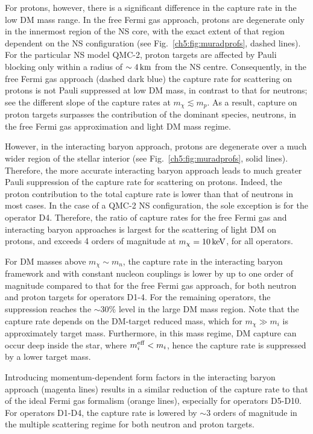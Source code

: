 For protons, however, there is a significant difference in the capture rate in the low DM mass range. In the free Fermi gas approach, protons are degenerate only in the innermost region of the NS core, with the exact extent of that region dependent on the NS configuration (see Fig.~\ref{ch5:fig:muradprofs}, dashed lines).  For the particular NS model QMC-2, proton targets are affected by Pauli blocking only within a radius of $\sim4{\rm \,km}$ from the NS centre. Consequently, in the free Fermi gas approach (dashed dark blue) the capture rate for scattering on protons is not Pauli suppressed at low DM mass, in contrast to that for neutrons; see the different slope of the capture rates at $m_\chi\lesssim m_p$.
As a result, capture on proton targets surpasses the contribution of the dominant species, neutrons, in the free Fermi gas approximation and light DM mass regime. 

However, in the interacting baryon approach, protons are degenerate over a much wider region of the stellar interior (see Fig.~\ref{ch5:fig:muradprofs}, solid lines). Therefore, the more accurate interacting baryon approach leads to much greater Pauli suppression of the capture rate for scattering on protons. Indeed, the proton contribution to the total capture rate is lower than that of neutrons in most cases. In the case of a QMC-2 NS configuration, the sole exception is for the operator D4. Therefore,  the ratio of capture rates for the free Fermi gas and interacting baryon approaches is largest for the scattering of light DM on protons, and exceeds 4 orders of magnitude at $m_\chi=10{\rm \,keV}$, for all operators. 


For DM masses above $m_\chi\sim m_n$, the capture rate in the interacting baryon framework and with constant nucleon couplings is lower by up to one order of magnitude compared to that for the free Fermi gas approach, for both neutron and proton targets for operators D1-4.
For the remaining operators, the suppression reaches the $\sim30\%$ level in the large DM mass region. 
Note that the capture rate depends on the DM-target reduced mass, which for $m_\chi\gg m_i$ is approximately target mass. Furthermore, in this mass regime, DM capture can occur deep inside the star, where $m_i^{\rm eff}<m_i$, hence the capture rate is suppressed by a lower target mass.

Introducing momentum-dependent form factors in the interacting baryon approach (magenta lines) results in a similar reduction of the capture rate to that of the ideal Fermi gas formalism (orange lines), especially for operators D5-D10. For operators D1-D4, the capture rate is lowered by $\sim3$ orders of magnitude in the multiple scattering regime for both neutron and proton targets. 


